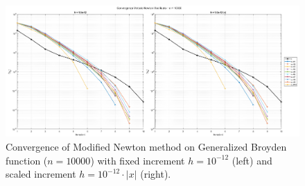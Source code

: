 \documentclass[a4paper,12pt]{article}
\begin{document}
	\begin{figure}[htbp]
		\centering
		\includegraphics[width=\textwidth]{../immagini/broyden_10k_h12.png}
		\caption{Convergence of Modified Newton method on Generalized Broyden function ($n=10000$) with fixed increment $h = 10^{-12}$ (left) and scaled increment $h = 10^{-12}\cdot|x|$ (right).}
		\label{fig:fd_broyden_10k_h12}
	\end{figure}
	\newpage
\end{document}
